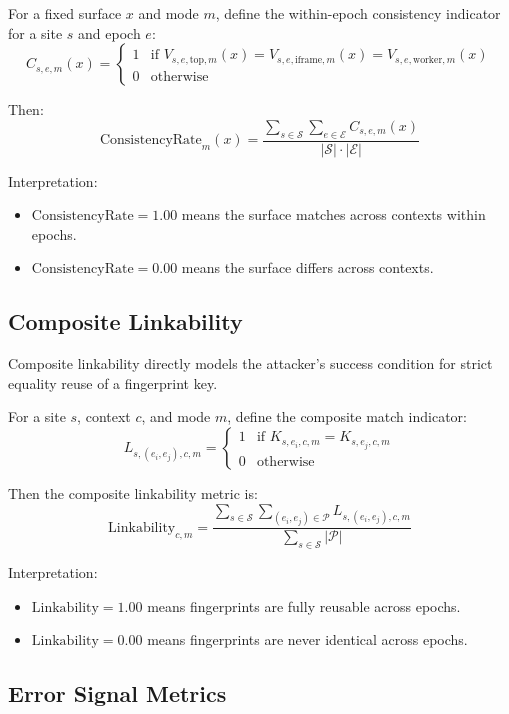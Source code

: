 \documentclass[11pt]{report}
\begin{document}
For a fixed surface $x$ and mode $m$, define the within-epoch consistency indicator for a site $s$ and epoch $e$:
\[
C_{s,e,m}(x) =
\begin{cases}
1 & \text{if } V_{s,e,\text{top},m}(x) = V_{s,e,\text{iframe},m}(x) = V_{s,e,\text{worker},m}(x) \\
0 & \text{otherwise}
\end{cases}
\]

Then:
\[
\text{ConsistencyRate}_{m}(x) =
\frac{\sum_{s \in \mathcal{S}} \sum_{e \in \mathcal{E}} C_{s,e,m}(x)}
{|\mathcal{S}|\cdot|\mathcal{E}|}
\]

Interpretation:
\begin{itemize}
    \item $\text{ConsistencyRate}=1.00$ means the surface matches across contexts within epochs.
    \item $\text{ConsistencyRate}=0.00$ means the surface differs across contexts.
\end{itemize}

\subsection{Composite Linkability}

Composite linkability directly models the attacker’s success condition for strict equality reuse of a fingerprint key.

For a site $s$, context $c$, and mode $m$, define the composite match indicator:
\[
L_{s,(e_i,e_j),c,m} =
\begin{cases}
1 & \text{if } K_{s,e_i,c,m} = K_{s,e_j,c,m} \\
0 & \text{otherwise}
\end{cases}
\]

Then the composite linkability metric is:
\[
\text{Linkability}_{c,m} =
\frac{\sum_{s \in \mathcal{S}} \sum_{(e_i,e_j)\in\mathcal{P}} L_{s,(e_i,e_j),c,m}}
{\sum_{s \in \mathcal{S}} |\mathcal{P}|}
\]

Interpretation:
\begin{itemize}
    \item $\text{Linkability}=1.00$ means fingerprints are fully reusable across epochs.
    \item $\text{Linkability}=0.00$ means fingerprints are never identical across epochs.
\end{itemize}

\subsection{Error Signal Metrics}
\end{document}
